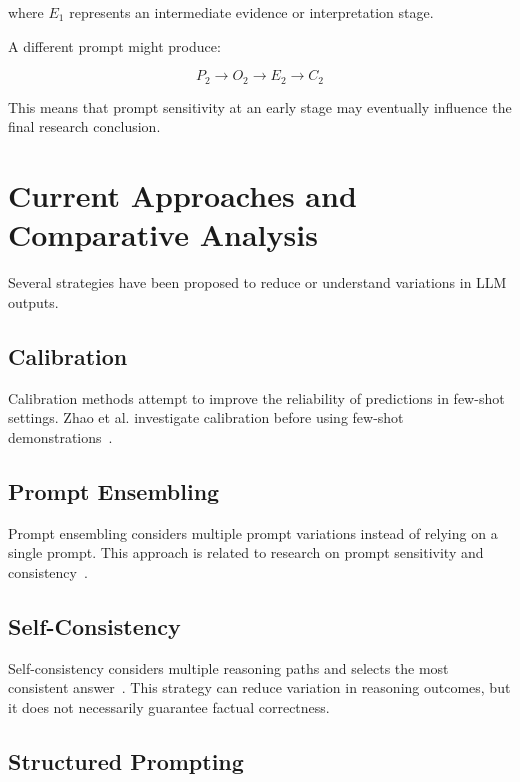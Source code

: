 \documentclass[acmsmall,screen,review]{acmart}
\begin{document}
where $E_1$ represents an intermediate evidence or interpretation stage.

A different prompt might produce:

\begin{equation}
P_2\rightarrow O_2\rightarrow E_2\rightarrow C_2
\label{eq:alternative-pipeline}
\end{equation}

This means that prompt sensitivity at an early stage may eventually influence the final research conclusion.

\section{Current Approaches and Comparative Analysis}
\label{sec:approaches}

Several strategies have been proposed to reduce or understand variations in LLM outputs.

\subsection{Calibration}

Calibration methods attempt to improve the reliability of predictions in few-shot settings. Zhao et al. investigate calibration before using few-shot demonstrations~\cite{zhao2021}.

\subsection{Prompt Ensembling}

Prompt ensembling considers multiple prompt variations instead of relying on a single prompt. This approach is related to research on prompt sensitivity and consistency~\cite{errica2025,zhuo2024}.

\subsection{Self-Consistency}

Self-consistency considers multiple reasoning paths and selects the most consistent answer~\cite{wang2023}. This strategy can reduce variation in reasoning outcomes, but it does not necessarily guarantee factual correctness.

\subsection{Structured Prompting}
\end{document}
